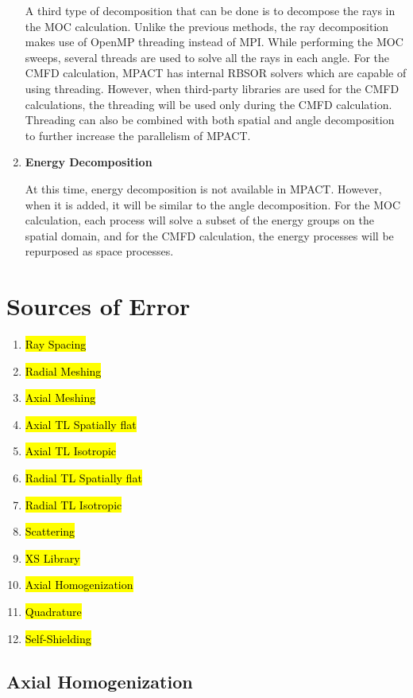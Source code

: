 \begin{enumerate}[leftmargin=*]
A third type of decomposition that can be done is to decompose the rays in the MOC calculation.  Unlike the previous methods, the ray decomposition makes use of OpenMP threading instead of MPI.  While performing the MOC sweeps, several threads are used to solve all the rays in each angle.  For the CMFD calculation, MPACT has internal RBSOR solvers which are capable of using threading.  However, when third-party libraries are used for the CMFD calculations, the threading will be used only during the CMFD calculation.  Threading can also be combined with both spatial and angle decomposition to further increase the parallelism of MPACT.

\item \textbf{Energy Decomposition}

At this time, energy decomposition is not available in MPACT.  However, when it is added, it will be similar to the angle decomposition.  For the MOC calculation, each process will solve a subset of the energy groups on the spatial domain, and for the CMFD calculation, the energy processes will be repurposed as space processes.
\end{enumerate}

\section{Sources of Error}

\begin{enumerate}[leftmargin=*]
\item \hl{Ray Spacing}
\item \hl{Radial Meshing}
\item \hl{Axial Meshing}
\item \hl{Axial TL Spatially flat}
\item \hl{Axial TL Isotropic}
\item \hl{Radial TL Spatially flat}
\item \hl{Radial TL Isotropic}
\item \hl{Scattering}
\item \hl{XS Library}
\item \hl{Axial Homogenization}
\item \hl{Quadrature}
\item \hl{Self-Shielding}
\end{enumerate}

\subsection{Axial Homogenization}

